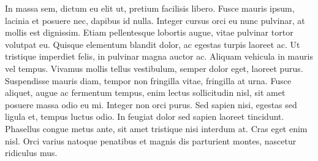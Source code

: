 \documentclass{novella}
\begin{document}
In massa sem, dictum eu elit ut, pretium facilisis libero. Fusce mauris ipsum, lacinia et posuere nec, dapibus id nulla. Integer cursus orci eu nunc pulvinar, at mollis est dignissim. Etiam pellentesque lobortis augue, vitae pulvinar tortor volutpat eu. Quisque elementum blandit dolor, ac egestas turpis laoreet ac. Ut tristique imperdiet felis, in pulvinar magna auctor ac. Aliquam vehicula in mauris vel tempus. Vivamus mollis tellus vestibulum, semper dolor eget, laoreet purus. Suspendisse mauris diam, tempor non fringilla vitae, fringilla at urna. Fusce aliquet, augue ac fermentum tempus, enim lectus sollicitudin nisl, sit amet posuere massa odio eu mi. Integer non orci purus. Sed sapien nisi, egestas sed ligula et, tempus luctus odio. In feugiat dolor sed sapien laoreet tincidunt. Phasellus congue metus ante, sit amet tristique nisi interdum at. Cras eget enim nisl. Orci varius natoque penatibus et magnis dis parturient montes, nascetur ridiculus mus.
\end{document}

